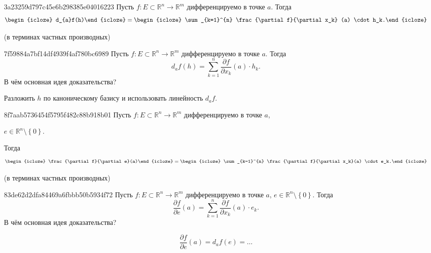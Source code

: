 \begin{note}{3a23259d797c45e6b298385e04016223}
    Пусть \({ f : E \subset \mathbb R^{n} \to \mathbb R^{m} }\) дифференцируемо в точке \({ a }\).
    Тогда
    \[
        \begin{icloze}{2}d_{a}f(h)\end{icloze} = \begin{icloze}{1}\sum_{k=1}^{n} \frac{\partial f}{\partial x_k} (a) \cdot h_k.\end{icloze}
    \]

    \begin{center}
        \tiny
        (в терминах частных производных)
    \end{center}
\end{note}

\begin{note}{7f59884a7bf14df4939f4af780bc6989}
    Пусть \({ f : E \subset \mathbb R^{n} \to \mathbb R^{m} }\) дифференцируемо в точке \({ a }\).
    Тогда
    \[
        d_{a}f(h) = \sum_{k=1}^{n} \frac{\partial f}{\partial x_k} (a) \cdot h_k.
    \]
    В чём основная идея доказательства?

    \begin{cloze}{1}
        Разложить \({ h }\) по каноническому базису и использовать линейность \({ d_{a}f }\).
    \end{cloze}
\end{note}

\begin{note}{8f7aab5736454f5795f482c88b918b01}
    Пусть \({ f : E \subset \mathbb R^{n} \to \mathbb R^{m} }\) дифференцируемо в точке \({ a }\),\: \begin{icloze}{3}\({ e \in \mathbb R^{n} \setminus \left\{ 0 \right\} }\).\end{icloze}
    Тогда
    \[
        \begin{icloze}{2}\frac{\partial f}{\partial e}(a)\end{icloze} = \begin{icloze}{1}\sum_{k=1}^{n} \frac{\partial f}{\partial x_k}(a) \cdot e_k.\end{icloze}
    \]

    \begin{center}
        \tiny
        (в терминах частных производных)
    \end{center}
\end{note}

\begin{note}{83de62d2dfa84469a6fbbb50b5934f72}
    Пусть \({ f : E \subset \mathbb R^{n} \to \mathbb R^{m} }\) дифференцируемо в точке \({ a }\),\: \({ e \in \mathbb R^{n} \setminus \left\{ 0 \right\} }\).
    Тогда
    \[
        \frac{\partial f}{\partial e}(a) = \sum_{k=1}^{n} \frac{\partial f}{\partial x_k}(a) \cdot e_k.
    \]
    В чём основная идея доказательства?

    \begin{cloze}{1}
        \[
            \frac{\partial f}{\partial e}(a) = d_{a}f(e) = \ldots
        \]
    \end{cloze}
\end{note}

